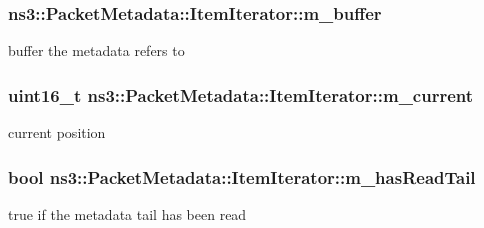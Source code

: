 \subsubsection[{\texorpdfstring{m\+\_\+buffer}{m_buffer}}]{ ns3\+::\+Packet\+Metadata\+::\+Item\+Iterator\+::m\+\_\+buffer\hspace{0.3cm}{\ttfamily [private]}}\hypertarget{classns3_1_1PacketMetadata_1_1ItemIterator_a28a05c78e0009cfda77bc74d3eefb30e}{}\label{classns3_1_1PacketMetadata_1_1ItemIterator_a28a05c78e0009cfda77bc74d3eefb30e}


buffer the metadata refers to 

\subsubsection[{\texorpdfstring{m\+\_\+current}{m_current}}]{\setlength{\rightskip}{0pt plus 5cm}uint16\+\_\+t ns3\+::\+Packet\+Metadata\+::\+Item\+Iterator\+::m\+\_\+current\hspace{0.3cm}{\ttfamily [private]}}\hypertarget{classns3_1_1PacketMetadata_1_1ItemIterator_a05a394b22a469fcd9adb8cf23916c437}{}\label{classns3_1_1PacketMetadata_1_1ItemIterator_a05a394b22a469fcd9adb8cf23916c437}


current position 

\subsubsection[{\texorpdfstring{m\+\_\+has\+Read\+Tail}{m_hasReadTail}}]{\setlength{\rightskip}{0pt plus 5cm}bool ns3\+::\+Packet\+Metadata\+::\+Item\+Iterator\+::m\+\_\+has\+Read\+Tail\hspace{0.3cm}{\ttfamily [private]}}\hypertarget{classns3_1_1PacketMetadata_1_1ItemIterator_a8ed1eb05c698cb72588f997f72e2788e}{}\label{classns3_1_1PacketMetadata_1_1ItemIterator_a8ed1eb05c698cb72588f997f72e2788e}


true if the metadata tail has been read 

